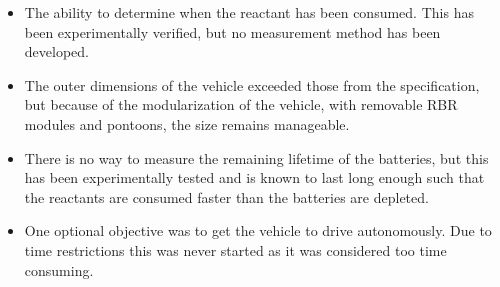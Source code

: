 \begin{itemize}
	\item The ability to determine when the reactant has been consumed. This has been experimentally verified, but no measurement method has been developed.
	\item The outer dimensions of the vehicle exceeded those from the specification, but because of the modularization of the vehicle, with removable RBR modules and pontoons, the size remains manageable.
	\item There is no way to measure the remaining lifetime of the batteries, but this has been experimentally tested and is known to last long enough such that the reactants are consumed faster than the batteries are depleted.
	\item One optional objective was to get the vehicle to drive autonomously. Due to time restrictions this was never started as it was considered too time consuming. 
\end{itemize}